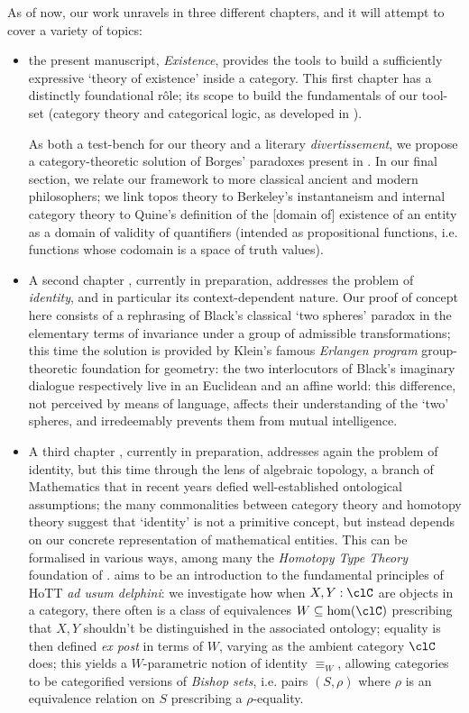 As of now, our work unravels in three different chapters, and it will attempt to cover a variety of topics:
\begin{itemize}
	\item the present manuscript, \emph{Existence}, provides the tools to build a sufficiently expressive `theory of existence' inside a category. This first chapter has a distinctly foundational r\^ole; its scope to build the fundamentals of our tool-set (category theory and categorical logic, as developed in \cite{mac1992sheaves,JohnstonePT,lambek1988introduction}).

	      As both a test-bench for our theory and a literary \emph{divertissement}, we propose a category-theoretic solution of Borges' paradoxes present in \cite{Borges1963}. In our final section, we relate our framework to more classical ancient and modern philosophers; we link topos theory to Berkeley's instantaneism and internal category theory to Quine's definition of the [domain of] existence of an entity as a domain of validity of quantifiers (intended as propositional functions, i.e. functions whose codomain is a space of truth values).
	\item A second chapter \cite{black}, currently in preparation, addresses the problem of \emph{identity}, and in particular its context-dependent nature. Our proof of concept here consists of a rephrasing of Black's classical `two spheres' paradox \cite{papear_di_black} in the elementary terms of invariance under a group of admissible transformations; this time the solution is provided by Klein's famous \emph{Erlangen program} group-theoretic foundation for geometry: the two interlocutors of Black's imaginary dialogue respectively live in an Euclidean and an affine world: this difference, not perceived by means of language, affects their understanding of the `two' spheres, and irredeemably prevents them from mutual intelligence.
	\item A third chapter \cite{homot}, currently in preparation, addresses again the problem of identity, but this time through the lens of algebraic topology, a branch of Mathematics that in recent years defied well\hyp{}established ontological assumptions; the many commonalities between category theory and homotopy theory suggest that `identity' is not a primitive concept, but instead depends on our concrete representation of mathematical entities. This can be formalised in various ways, among many the \emph{Homotopy Type Theory} foundation of \cite{hottbook,cwp}. \cite{homot} aims to be an introduction to the fundamental principles of HoTT \emph{ad usum delphini}: we investigate how when $X,Y : \clC$ are objects in a category, there often is a class of equivalences $W \subseteq \hom(\clC)$ prescribing that $X,Y$ shouldn't be distinguished in the associated ontology; equality is then defined \emph{ex post} in terms of $W$, varying as the ambient category $\clC$ does; this yields a $W$-parametric notion of identity $\equiv_W$, allowing categories to be categorified versions of \emph{Bishop sets}, i.e. pairs $(S,\rho)$ where $\rho$ is an equivalence relation on $S$ prescribing a $\rho$-equality.
\end{itemize}
